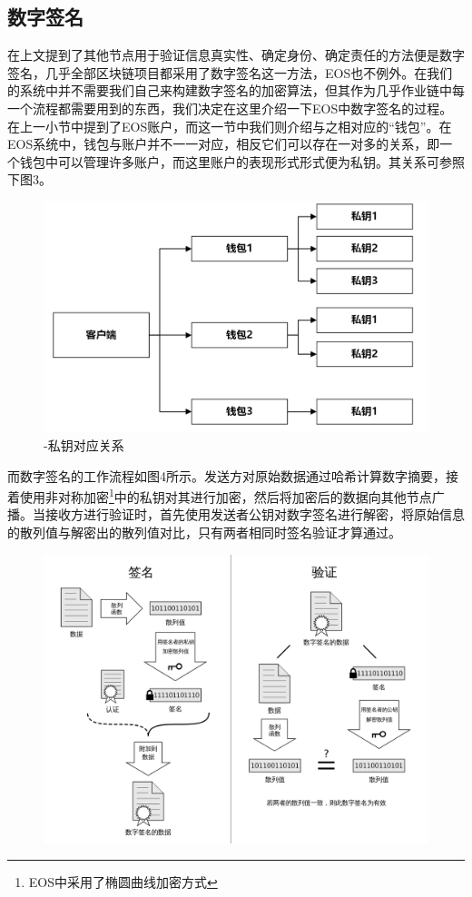 \documentclass[UTF8]{ctexart}
\begin{document}
\begin{multicols}{2}
  \subsection{数字签名}
  在上文提到了其他节点用于验证信息真实性、确定身份、确定责任的方法便是数字签名，几乎全部区块链项目都采用了数字签名这一方法，EOS也不例外。在我们的系统中并不需要我们自己来构建数字签名的加密算法，但其作为几乎作业链中每一个流程都需要用到的东西，我们决定在这里介绍一下EOS中数字签名的过程。\\
  \indent 在上一小节中提到了EOS账户，而这一节中我们则介绍与之相对应的“钱包”。在EOS系统中，钱包与账户并不一一对应，相反它们可以存在一对多的关系，即一个钱包中可以管理许多账户，而这里账户的表现形式形式便为私钥。其关系可参照下图3。\\
  \begin{figure}[H]
    \centering
    \includegraphics[width=\linewidth]{image/psw.png}
    \caption{\heiti{}-私钥对应关系\songti}
  \end{figure}
  \indent 而数字签名的工作流程如图4所示。发送方对原始数据通过哈希计算数字摘要，接着使用非对称加密\footnote[1]{EOS中采用了椭圆曲线加密方式}中的私钥对其进行加密，然后将加密后的数据向其他节点广播。当接收方进行验证时，首先使用发送者公钥对数字签名进行解密，将原始信息的散列值与解密出的散列值对比，只有两者相同时签名验证才算通过。
  \begin{figure}[H]
    \centering
    \includegraphics[width=\linewidth]{image/check.png}
    \caption{\heiti{}\songti}
  \end{figure}


\end{multicols}
\end{document}
